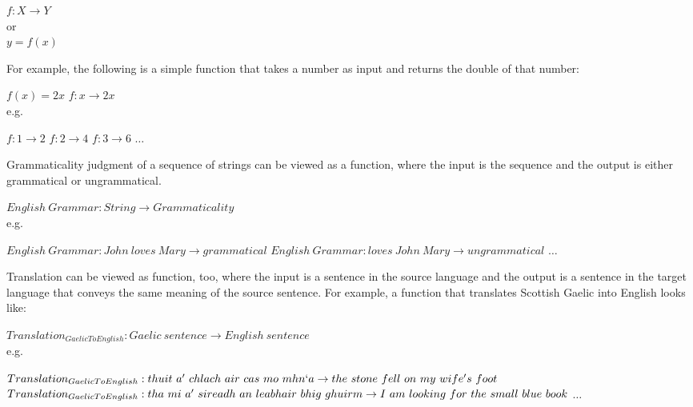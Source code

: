 \begin{exe}
\ex $f: X \rightarrow Y$\\
	or \\
	$ y=f(x) $
\end{exe} 


For example, the following is a simple function that takes a number as input and returns the double of that number:

\begin{exe}
\ex \label{math_function}
\begin{xlist}
\ex $f(x)=2x$
\ex $f: x \rightarrow 2x $\\
	e.g.
	\begin{xlist}
	\ex $f: 1 \rightarrow 2$
	\ex $f: 2 \rightarrow 4$
	\ex $f: 3 \rightarrow 6$
	\ex $\dots$
	\end{xlist}
\end{xlist}
\end{exe}

Grammaticality judgment of a sequence of strings can be viewed as a function, where the input is the sequence and the output is either grammatical or ungrammatical.  

\begin{exe}
\ex 
\begin{xlist}
\ex $English\ Grammar: String \rightarrow Grammaticality$\\
	e.g.
	\begin{xlist}
	\ex $English\ Grammar:  John\ loves\ Mary \rightarrow grammatical $
	\ex $English\ Grammar: loves\ John\ Mary \rightarrow ungrammatical $
	\ex $\dots$
	\end{xlist}
\end{xlist}
\end{exe}

Translation can be viewed as function, too, where the input is a sentence in the source language and the output is a sentence in the target language that conveys the same meaning of the source sentence. For example, a function that translates Scottish Gaelic into English looks like:   

\begin{exe}
\ex 
\begin{xlist}
\ex $Translation_{GaelicToEnglish}: Gaelic\ sentence
 \rightarrow English\ sentence$\\
	e.g.
	\begin{xlist}
	\ex $Translation_{GaelicToEnglish}:\\
	  thuit\ a'\ chlach\ air\ cas\ mo\ mhn`a\\ 
	  \rightarrow\\
	   the\ stone\ fell\ on\ my\ wife's\ foot $
	\ex $Translation_{GaelicToEnglish}:\\
	  tha\ mi\ a'\ sireadh\ an\ leabhair\ bhig\ ghuirm\\
	  \rightarrow\\
	   I\ am\ looking\ for\ the\ small\ blue\ book $
	\ex $\dots$
	\end{xlist}
\end{xlist}
\end{exe}

